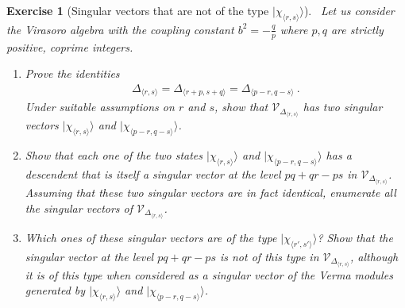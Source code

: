 \documentclass[12pt, a4paper, notitlepage, twoside]{report}
\numberwithin{equation}{section}
\theoremstyle{break}
\newtheorem{exo}{Exercise}[chapter]
\begin{document}
\begin{exo}[Singular vectors that are not of the type $|\chi_{\langle r,s \rangle}\rangle$]
 ~\label{exosv}
Let us consider the Virasoro algebra with the coupling constant $b^2=-\frac{q}{p}$ where $p,q$ are strictly positive, coprime integers.
\begin{enumerate}
 \item 
Prove the identities 
\begin{align}
 \Delta_{\langle r,s \rangle}=\Delta_{\langle r+p,s+q \rangle}=\Delta_{\langle p-r,q-s \rangle}\ .
\end{align}
Under suitable assumptions on $r$ and $s$, show that $\mathcal{V}_{\Delta_{\langle r,s \rangle}}$ has two singular vectors $|\chi_{\langle r,s \rangle}\rangle$ and $|\chi_{\langle p-r,q-s \rangle}\rangle$.
\item
Show that each one of the two states  $|\chi_{\langle r,s \rangle}\rangle$ and $|\chi_{\langle p-r,q-s \rangle}\rangle$ has a descendent that is itself a singular vector at the level $pq+qr-ps$ in $\mathcal{V}_{\Delta_{\langle r,s \rangle}}$.
Assuming that these two singular vectors are in fact identical, enumerate all the singular vectors of $\mathcal{V}_{\Delta_{\langle r,s \rangle}}$.
\item
Which ones of these singular vectors are of the type $|\chi_{\langle r',s' \rangle}\rangle$? Show that the singular vector at the level $pq+qr-ps$ is not of this type in $\mathcal{V}_{\Delta_{\langle r,s \rangle}}$, although it is of this type when considered as a singular vector of the Verma modules generated by $|\chi_{\langle r,s \rangle}\rangle$ and $|\chi_{\langle p-r,q-s \rangle}\rangle$.
\end{enumerate}
\end{exo}
\end{document}
